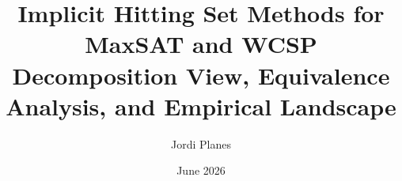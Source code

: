 \documentclass[11pt,a4paper]{article}
\title{Implicit Hitting Set Methods for MaxSAT and WCSP\\[0.5em]
       \large Decomposition View, Equivalence Analysis, and Empirical Landscape}
\author{Jordi Planes}
\date{June 2026}
\begin{document}
\maketitle



\tableofcontents
\listofalgorithms

















\end{document}
